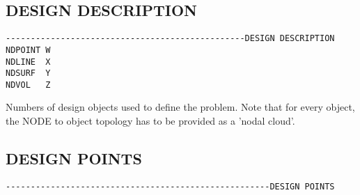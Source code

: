
\subsection{DESIGN DESCRIPTION}
\begin{verbatim}
------------------------------------------------DESIGN DESCRIPTION
NDPOINT W
NDLINE  X
NDSURF  Y
NDVOL   Z
\end{verbatim}

Numbers of design objects used to define the problem. Note that for every
object, the NODE to object topology has to be provided as a 'nodal cloud'.
\subsection{DESIGN POINTS}
\begin{verbatim}
-----------------------------------------------------DESIGN POINTS
\end{verbatim}



